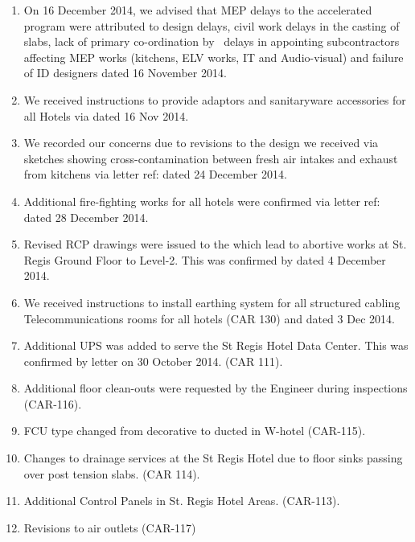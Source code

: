 \begin{enumerate}
\item On 16 December 2014, we advised that MEP delays to the accelerated program were attributed to design delays, civil work delays in the casting of slabs, lack of primary co-ordination by \KA\ delays in appointing subcontractors affecting MEP works (kitchens, ELV works, IT and Audio-visual) and failure of ID designers  dated 16 November 2014.
  
\item We received instructions to provide adaptors and sanitaryware accessories for all Hotels via   dated 16 Nov 2014. 

\item We recorded our concerns due to revisions to the design we received via sketches showing cross-contamination between fresh air intakes and exhaust from kitchens via letter ref:  dated 24 December 2014.

\item Additional fire-fighting works for all hotels were confirmed via letter ref:  dated 28 December 2014.

\item Revised RCP drawings were issued to the \JV which lead to abortive works at St. Regis Ground Floor to Level-2. This was confirmed by  dated 4 December 2014.

\item We received instructions to install earthing system for all structured cabling Telecommunications rooms for all hotels (CAR 130) and  dated 3 Dec 2014.

\item Additional UPS was added to serve the St Regis Hotel Data Center. This was confirmed by letter on 30 October 2014. (CAR 111).

\item Additional floor clean-outs were requested by the Engineer during inspections (CAR-116).

\item FCU type changed from decorative to ducted in W-hotel (CAR-115).

\item Changes to drainage services at the St Regis Hotel due to floor sinks passing over post tension slabs. (CAR 114).

\item Additional Control Panels in St. Regis Hotel Areas. (CAR-113).

\item Revisions to air outlets (CAR-117)


\end{enumerate}
